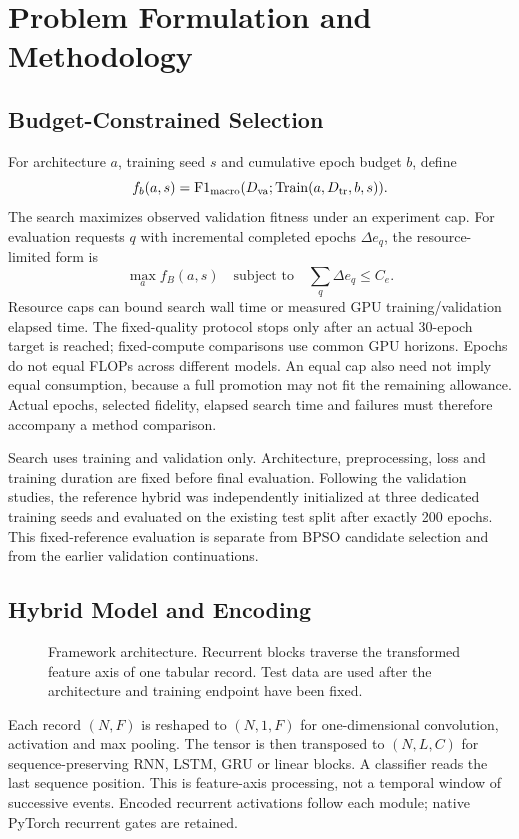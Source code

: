 \section{Problem Formulation and Methodology}
\subsection{Budget-Constrained Selection}
For architecture $a$, training seed $s$ and cumulative epoch budget $b$, define
\begin{equation}
 f_b(a,s)=\mathrm{F1}_{\mathrm{macro}}(D_{\rm va};\operatorname{Train}(a,D_{\rm tr},b,s)).
\end{equation}
The search maximizes observed validation fitness under an experiment cap. For evaluation requests $q$ with incremental completed epochs $\Delta e_q$, the resource-limited form is
\begin{equation}
 \max_a f_B(a,s)\quad\text{subject to}\quad\sum_q\Delta e_q\leq C_e.
\end{equation}
Resource caps can bound search wall time or measured GPU training/validation elapsed time. The fixed-quality protocol stops only after an actual 30-epoch target is reached; fixed-compute comparisons use common GPU horizons. Epochs do not equal FLOPs across different models. An equal cap also need not imply equal consumption, because a full promotion may not fit the remaining allowance. Actual epochs, selected fidelity, elapsed search time and failures must therefore accompany a method comparison.

Search uses training and validation only. Architecture, preprocessing, loss and training duration are fixed before final evaluation. Following the validation studies, the reference hybrid was independently initialized at three dedicated training seeds and evaluated on the existing test split after exactly 200 epochs. This fixed-reference evaluation is separate from BPSO candidate selection and from the earlier validation continuations.

\subsection{Hybrid Model and Encoding}
\begin{figure}[!t]\centering
\caption{Framework architecture. Recurrent blocks traverse the transformed feature axis of one tabular record. Test data are used after the architecture and training endpoint have been fixed.}\label{fig:architecture}\end{figure}
Each record $(N,F)$ is reshaped to $(N,1,F)$ for one-dimensional convolution, activation and max pooling. The tensor is then transposed to $(N,L,C)$ for sequence-preserving RNN, LSTM, GRU or linear blocks. A classifier reads the last sequence position. This is feature-axis processing, not a temporal window of successive events. Encoded recurrent activations follow each module; native PyTorch recurrent gates are retained.

